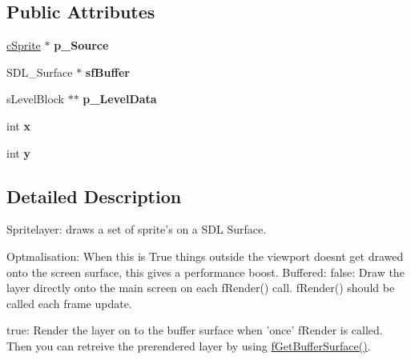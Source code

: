 \subsection*{Public Attributes}
\begin{DoxyCompactItemize}
\item 
\hypertarget{classc_sprite_layer_aa9ab70d8f1f530b29f3b810aeaa2130c}{\hyperlink{classc_sprite}{c\-Sprite} $\ast$ {\bfseries p\-\_\-\-Source}}\label{classc_sprite_layer_aa9ab70d8f1f530b29f3b810aeaa2130c}

\item 
\hypertarget{classc_sprite_layer_a086faca734a40c3f92ab10cfd8d7f458}{S\-D\-L\-\_\-\-Surface $\ast$ {\bfseries sf\-Buffer}}\label{classc_sprite_layer_a086faca734a40c3f92ab10cfd8d7f458}

\item 
\hypertarget{classc_sprite_layer_ad3349a975340a5b3bb820f08ab205aac}{s\-Level\-Block $\ast$$\ast$ {\bfseries p\-\_\-\-Level\-Data}}\label{classc_sprite_layer_ad3349a975340a5b3bb820f08ab205aac}

\item 
\hypertarget{classc_sprite_layer_a49266cf4ee91ab9da9a8d0b76b84227f}{int {\bfseries x}}\label{classc_sprite_layer_a49266cf4ee91ab9da9a8d0b76b84227f}

\item 
\hypertarget{classc_sprite_layer_a9a4e4406d781d9171ad914d9189e871c}{int {\bfseries y}}\label{classc_sprite_layer_a9a4e4406d781d9171ad914d9189e871c}

\end{DoxyCompactItemize}


\subsection{Detailed Description}
Spritelayer\-: draws a set of sprite's on a S\-D\-L Surface.

Optmalisation\-: When this is True things outside the viewport doesnt get drawed onto the screen surface, this gives a performance boost. Buffered\-: false\-: Draw the layer directly onto the main screen on each f\-Render() call. f\-Render() should be called each frame update.

true\-: Render the layer on to the buffer surface when 'once' f\-Render is called. Then you can retreive the prerendered layer by using \hyperlink{classc_sprite_layer_a826a9f912c57d78a584507f697d6f3ab}{f\-Get\-Buffer\-Surface()}. 

